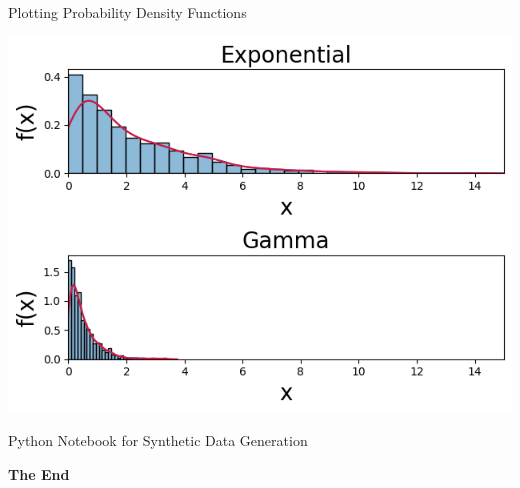 \documentclass[aspectratio=169,xcolor=dvipsnames,svgnames,x11names,fleqn]{beamer}
\begin{document}
    \begin{frame}[containsverbatim]{Plotting Probability Density Functions}
    \begin{center}
        \includegraphics[height=.6\textheight]{figures/PDFs.png}
    
    \end{center}
    \end{frame}
    
    
    \begin{frame}[containsverbatim]{Python Notebook for Synthetic Data Generation}
    \begin{center}
    \small
    { }
    
    \end{center}
    \end{frame}
    
    
    \begin{frame}
        \Huge{\centerline{\color{MediumBlue}\textbf{The End}}}
    \end{frame}
\end{document}
